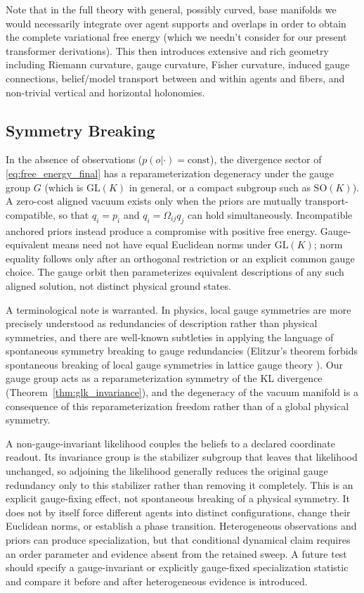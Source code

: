 \documentclass[twoside,11pt]{article}
\begin{document}
Note that in the full theory with general, possibly curved, base manifolds we would necessarily integrate over agent supports and overlaps in order to obtain the complete variational free energy (which we needn't consider for our present transformer derivations). This then introduces extensive and rich geometry including Riemann curvature, gauge curvature, Fisher curvature, induced gauge connections, belief/model transport between and within agents and fibers, and non-trivial vertical and horizontal holonomies.

\subsection{Symmetry Breaking}
\label{sec:symmetry_breaking}
In the absence of observations ($p(o|\cdot) = \text{const}$), the divergence sector of \eqref{eq:free_energy_final} has a reparameterization degeneracy under the gauge group $G$ (which is $\mathrm{GL}(K)$ in general, or a compact subgroup such as $\mathrm{SO}(K)$). A zero-cost aligned vacuum exists only when the priors are mutually transport-compatible, so that $q_i=p_i$ and $q_i=\Omega_{ij}q_j$ can hold simultaneously. Incompatible anchored priors instead produce a compromise with positive free energy. Gauge-equivalent means need not have equal Euclidean norms under $\mathrm{GL}(K)$; norm equality follows only after an orthogonal restriction or an explicit common gauge choice. The gauge orbit then parameterizes equivalent descriptions of any such aligned solution, not distinct physical ground states.

A terminological note is warranted. In physics, local gauge symmetries are more precisely understood as redundancies of description rather than physical symmetries, and there are well-known subtleties in applying the language of spontaneous symmetry breaking to gauge redundancies (Elitzur's theorem forbids spontaneous breaking of local gauge symmetries in lattice gauge theory \citep{elitzur1975impossibility, weinberg1995quantum}). Our gauge group acts as a reparameterization symmetry of the KL divergence (Theorem~\ref{thm:glk_invariance}), and the degeneracy of the vacuum manifold is a consequence of this reparameterization freedom rather than of a global physical symmetry.

A non-gauge-invariant likelihood couples the beliefs to a declared coordinate readout. Its invariance group is the stabilizer subgroup that leaves that likelihood unchanged, so adjoining the likelihood generally reduces the original gauge redundancy only to this stabilizer rather than removing it completely. This is an explicit gauge-fixing effect, not spontaneous breaking of a physical symmetry. It does not by itself force different agents into distinct configurations, change their Euclidean norms, or establish a phase transition. Heterogeneous observations and priors can produce specialization, but that conditional dynamical claim requires an order parameter and evidence absent from the retained sweep. A future test should specify a gauge-invariant or explicitly gauge-fixed specialization statistic and compare it before and after heterogeneous evidence is introduced.
\end{document}
